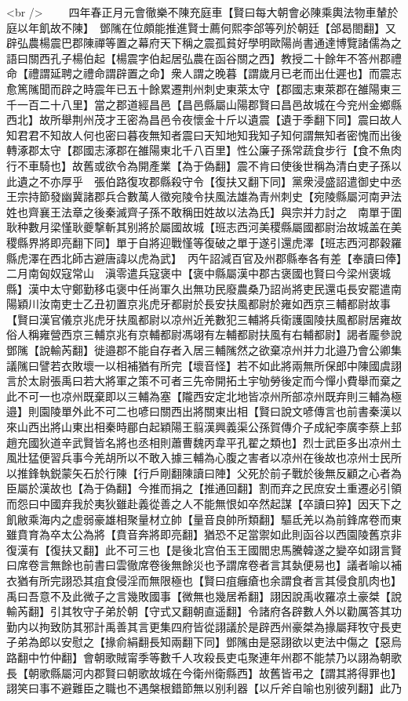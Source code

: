 <br />
　　四年春正月元會徹樂不陳充庭車【賢曰每大朝會必陳乘輿法物車輦於庭以年飢故不陳】　鄧隲在位頗能推進賢士薦何熙李郃等列於朝廷【郃曷閤翻】又辟弘農楊震巴郡陳禪等置之幕府天下稱之震孤貧好學明歐陽尚書通達博覽諸儒為之語曰關西孔子楊伯起【楊震字伯起居弘農在函谷關之西】教授二十餘年不答州郡禮命【禮謂延聘之禮命謂辟置之命】衆人謂之晚暮【謂歲月已老而出仕遲也】而震志愈篤隲聞而辟之時震年已五十餘累遷荆州刺史東萊太守【郡國志東萊郡在雒陽東三千一百二十八里】當之郡道經昌邑【昌邑縣屬山陽郡賢曰昌邑故城在今兖州金鄉縣西北】故所舉荆州茂才王密為昌邑令夜懷金十斤以遺震【遺于季翻下同】震曰故人知君君不知故人何也密曰暮夜無知者震曰天知地知我知子知何謂無知者密愧而出後轉涿郡太守【郡國志涿郡在雒陽東北千八百里】性公廉子孫常蔬食步行【食不魚肉行不車騎也】故舊或欲令為開產業【為于偽翻】震不肯曰使後世稱為清白吏子孫以此遺之不亦厚乎　張伯路復攻郡縣殺守令【復扶又翻下同】黨衆浸盛詔遣御史中丞王宗持節發幽冀諸郡兵合數萬人徵宛陵令扶風法雄為青州刺史【宛陵縣屬河南尹法姓也齊襄王法章之後秦滅齊子孫不敢稱田姓故以法為氏】與宗并力討之　南單于圍耿种數月梁慬耿夔撃斬其别將於屬國故城【班志西河美稷縣屬國都尉治故城盖在美稷縣界將即亮翻下同】單于自將迎戰慬等復破之單于遂引還虎澤【班志西河郡穀羅縣虎澤在西北師古避唐諱以虎為武】　丙午詔減百官及州郡縣奉各有差【奉讀曰俸】二月南匈奴寇常山　滇零遣兵寇褒中【褒中縣屬漢中郡古褒國也賢曰今梁州褒城縣】漢中太守鄭勤移屯褒中任尚軍久出無功民廢農桑乃詔尚將吏民還屯長安罷遣南陽穎川汝南吏士乙丑初置京兆虎牙都尉於長安扶風都尉於雍如西京三輔都尉故事【賢曰漢官儀京兆虎牙扶風都尉以凉州近羌數犯三輔將兵衛護園陵扶風都尉居雍故俗人稱雍營西京三輔京兆有京輔都尉馮翊有左輔都尉扶風有右輔都尉】謁者龎參說鄧隲【說輸芮翻】徙邉郡不能自存者入居三輔隲然之欲棄凉州并力北邉乃會公卿集議隲曰譬若衣敗壞一以相補猶有所完【壞音怪】若不如此將兩無所保郎中陳國虞詡言於太尉張禹曰若大將軍之策不可者三先帝開拓土宇劬勞後定而今憚小費舉而棄之此不可一也凉州既棄即以三輔為塞【隴西安定北地皆凉州所部凉州既弃則三輔為極邉】則園陵單外此不可二也喭曰關西出將關東出相【賢曰說文喭傳言也前書秦漢以來山西出將山東出相秦時郿白起穎陽王翦漢興義渠公孫賀傳介子成紀李廣李蔡上邽趙充國狄道辛武賢皆名將也丞相則蕭曹魏丙韋平孔翟之類也】烈士武臣多出凉州土風壯猛便習兵事今羌胡所以不敢入據三輔為心腹之害者以凉州在後故也凉州士民所以推鋒執鋭蒙矢石於行陳【行戶剛翻陳讀曰陣】父死於前子戰於後無反顧之心者為臣屬於漢故也【為于偽翻】今推而捐之【推通回翻】割而弃之民庶安土重遷必引領而怨曰中國弃我於夷狄雖赴義從善之人不能無恨如卒然起謀【卒讀曰猝】因天下之飢敝乘海内之虚弱豪雄相聚量材立帥【量音良帥所類翻】驅氐羌以為前鋒席卷而東雖賁育為卒太公為將【賁音奔將即亮翻】猶恐不足當禦如此則函谷以西園陵舊京非復漢有【復扶又翻】此不可三也【是後北宫伯玉王國閻忠馬騰韓遂之變卒如詡言賢曰席卷言無餘也前書曰雲徹席卷後無餘災也予謂席卷者言其埶便易也】議者喻以補衣猶有所完詡恐其疽食侵淫而無限極也【賢曰疽癰瘡也余謂食者言其侵食肌肉也】禹曰吾意不及此微子之言幾敗國事【微無也幾居希翻】詡因說禹收羅凉土豪桀【說輸芮翻】引其牧守子弟於朝【守式又翻朝直遥翻】令諸府各辟數人外以勸厲答其功勤内以拘致防其邪計禹善其言更集四府皆從詡議於是辟西州豪桀為掾屬拜牧守長吏子弟為郎以安慰之【掾俞絹翻長知兩翻下同】鄧隲由是惡詡欲以吏法中傷之【惡烏路翻中竹仲翻】會朝歌賊甯季等數千人攻殺長吏屯聚連年州郡不能禁乃以詡為朝歌長【朝歌縣屬河内郡賢曰朝歌故城在今衛州衛縣西】故舊皆弔之【謂其將得罪也】詡笑曰事不避難臣之職也不遇槃根錯節無以别利器【以斤斧自喻也别彼列翻】此乃
